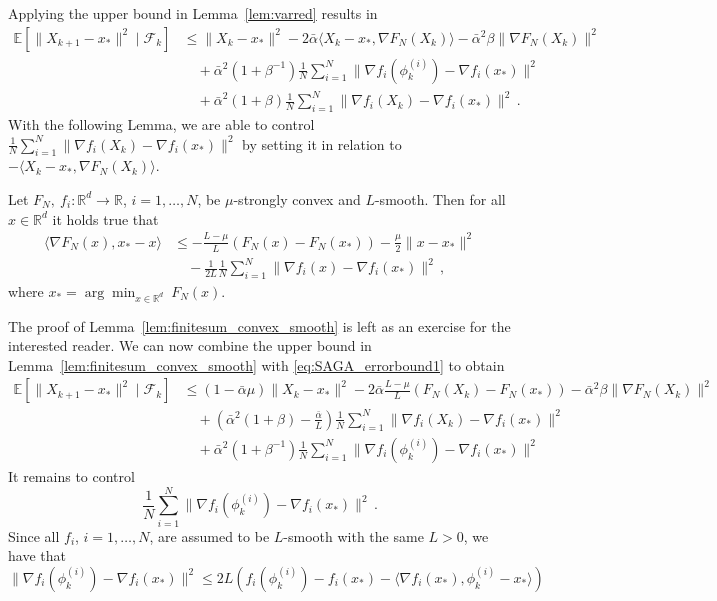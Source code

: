 \documentclass[12pt,openany]{book}
\theoremstyle{definition}
\theoremstyle{definition}
\newcommand{\cF}{\mathcal{F}}
\newcommand{\E}{\mathbb{E}}
\newcommand{\R}{\mathbb{R}}
\begin{document}
Applying the upper bound in Lemma~\ref{lem:varred} results in
\begin{equation}\label{eq:SAGA_errorbound1}
\begin{split}
\E[\|X_{k+1}-x_\ast\|^2\mid \cF_k]&\le \|X_k-x_\ast\|^2 -2\bar\alpha \langle X_k-x_\ast, \nabla F_N(X_k)\rangle -\bar\alpha^2\beta \|\nabla F_N(X_k)\|^2\\
&\quad +\bar\alpha^2 (1+\beta^{-1})\frac1N\sum_{i=1}^N\|\nabla f_i(\phi_k^{(i)})-\nabla f_i(x_\ast)\|^2\\ &\quad +\bar\alpha^2 (1+\beta) \frac1N\sum_{i=1}^N\|\nabla f_i(X_k)-\nabla f_i(x_\ast)\|^2\,.
\end{split}
\end{equation}
With the following Lemma, we are able to control $\frac1N\sum_{i=1}^N\|\nabla f_i(X_k)-\nabla f_i(x_\ast)\|^2$ by setting it in relation to $-\langle X_k-x_\ast, \nabla F_N(X_k)\rangle$.
\begin{lemma}\label{lem:finitesum_convex_smooth}
Let $F_N,\ f_i:\R^d\to\R$, $i=1,\dots,N$, be $\mu$-strongly convex and $L$-smooth. Then for all $x\in\R^d$ it holds true that 
\begin{align*}
\langle \nabla F_N(x), x_\ast-x\rangle &\le -\frac{L-\mu}{L} (F_N(x)-F_N(x_\ast)) - \frac{\mu}2\|x-x_\ast\|^2\\&\quad - \frac{1}{2L}\frac1N\sum_{i=1}^N\|\nabla f_i(x)-\nabla f_i(x_\ast)\|^2\,,
\end{align*}
where $x_\ast =\arg\min_{x\in\R^d}\ F_N(x)$.
\end{lemma}
The proof of Lemma~\ref{lem:finitesum_convex_smooth} is left as an exercise for the interested reader. We can now combine the upper bound in Lemma~\ref{lem:finitesum_convex_smooth} with \eqref{eq:SAGA_errorbound1} to obtain
\begin{align*}
\E[\|X_{k+1}-x_\ast\|^2\mid \cF_k] &\le (1-\bar\alpha\mu)\|X_k-x_\ast\|^2-2\bar\alpha \frac{L-\mu}{L} \left(F_N(X_k)-F_N(x_\ast)\right)-\bar\alpha^2 \beta\|\nabla F_N(X_k)\|^2\\
&\quad + (\bar\alpha^2(1+\beta)-\frac{\bar\alpha}L) \frac1N\sum_{i=1}^N\|\nabla f_i(X_k)-\nabla f_i(x_\ast)\|^2\\
&\quad + \bar\alpha^2(1+\beta^{-1})\frac1N\sum_{i=1}^N\|\nabla f_i(\phi_k^{(i)})-\nabla f_i(x_\ast)\|^2
\end{align*}
It remains to control 
\[\frac1N\sum_{i=1}^N\|\nabla f_i(\phi_k^{(i)})-\nabla f_i(x_\ast)\|^2\,.\]
Since all $f_i$, $i=1,\dots,N$, are assumed to be $L$-smooth with the same $L>0$, we have that
\[\|\nabla f_i(\phi_k^{(i)})-\nabla f_i(x_\ast)\|^2\le 2L(f_i(\phi_k^{(i)})-f_i(x_\ast)-\langle \nabla f_i(x_\ast),\phi_k^{(i)}-x_\ast\rangle)\]
\end{document}
